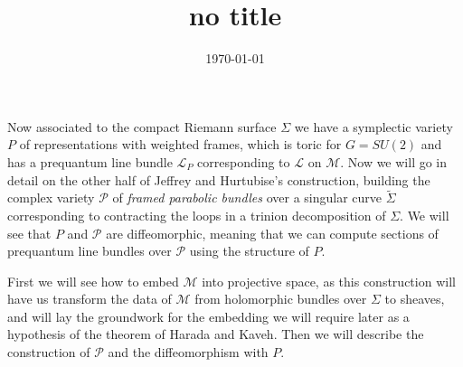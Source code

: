 \documentclass[]{article}
\title{no title}
\date{\today}
\newcommand{\LL}{\mathcal{L}}
\newcommand{\MM}{\mathcal{M}}
\newcommand{\cP}{\mathcal{P}}
\begin{document}
	Now associated to the compact Riemann surface $\Sigma$ we have a symplectic variety $P$ of representations with weighted frames, which is toric for $G=SU(2)$ and has a prequantum line bundle $\LL_P$ corresponding to $\LL$ on $\MM$. Now we will go in detail on the other half of Jeffrey and Hurtubise's construction, building the complex variety $\cP$ of \emph{framed parabolic bundles} over a singular curve $\tilde{\Sigma}$ corresponding to contracting the loops in a trinion decomposition of $\Sigma$. We will see that $P$ and $\cP$ are diffeomorphic, meaning that we can compute sections of prequantum line bundles over $\cP$ using the structure of $P$.
	
	First we will see how to embed $\MM$ into projective space, as this construction will have us transform the data of $\MM$ from holomorphic bundles over $\Sigma$ to sheaves, and will lay the groundwork for the embedding we will require later as a hypothesis of the theorem of Harada and Kaveh. Then we will describe the construction of $\cP$ and the diffeomorphism with $P$.
\end{document}
